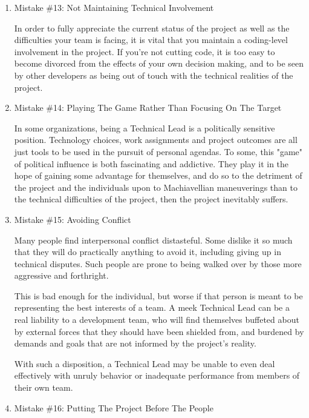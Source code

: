\documentclass{article}
\begin{document}
\begin{enumerate}
\item Mistake \#13: Not Maintaining Technical Involvement
\label{sec:orgheadline156}

In order to fully appreciate the current status of the project as well
as the difficulties your team is facing, it is vital that you maintain a
coding-level involvement in the project. If you're not cutting code, it
is too easy to become divorced from the effects of your own decision
making, and to be seen by other developers as being out of touch with
the technical realities of the project.

\item Mistake \#14: Playing The Game Rather Than Focusing On The Target
\label{sec:orgheadline157}

In some organizations, being a Technical Lead is a politically sensitive
position. Technology choices, work assignments and project outcomes are
all just tools to be used in the pursuit of personal agendas. To some,
this "game" of political influence is both fascinating and addictive.
They play it in the hope of gaining some advantage for themselves, and
do so to the detriment of the project and the individuals upon to
Machiavellian maneuverings than to the technical difficulties of the
project, then the project inevitably suffers.

\item Mistake \#15: Avoiding Conflict
\label{sec:orgheadline158}

Many people find interpersonal conflict distasteful. Some dislike it so
much that they will do practically anything to avoid it, including
giving up in technical disputes. Such people are prone to being walked
over by those more aggressive and forthright.

This is bad enough for the individual, but worse if that person is meant
to be representing the best interests of a team. A meek Technical Lead
can be a real liability to a development team, who will find themselves
buffeted about by external forces that they should have been shielded
from, and burdened by demands and goals that are not informed by the
project's reality.

With such a disposition, a Technical Lead may be unable to even deal
effectively with unruly behavior or inadequate performance from members
of their own team.

\item Mistake \#16: Putting The Project Before The People
\label{sec:orgheadline159}


\end{enumerate}
\end{document}
